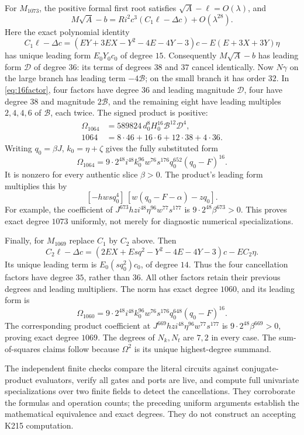 For $M_{1073}$, the positive formal first root satisfies
$\sqrt A-\ell=O(\lambda)$, and
\[
 M\sqrt A-b=Ri^2c^3(C_1\ell-\Delta c)+O(\lambda^{28}).
\]
Here the exact polynomial identity
\[
 C_1\ell-\Delta c
 =(EY+3EX-Y^2-4E-4Y-3)c-E(E+3X+3Y)\eta
\]
has unique leading form $E_0Y_0c_0$ of degree $15$.
Consequently $M\sqrt A-b$ has leading form $\mathcal D$ of degree $36$:
its terms of degrees $38$ and $37$ cancel identically.
Now $N\gamma$ on the large branch has leading term $-4\mathcal B$;
on the small branch it has order $32$.
In \eqref{eq:16factor}, four factors have degree $36$ and leading
magnitude $\mathcal D$, four have degree $38$ and magnitude
$2\mathcal B$, and the remaining eight have leading multiples
$2,4,4,6$ of $\mathcal B$, each twice. The signed product is positive:
\begin{align*}
 \Omega_{1064}
 &=589824\,d_0^8H_0^{16}\mathcal B^{12}\mathcal D^4,\\
 1064&=8\cdot46+16\cdot6+12\cdot38+4\cdot36.
\end{align*}
Writing $q_0=\beta J$, $k_0=\eta+\zeta$ gives the fully substituted form
\begin{equation}
 \Omega_{1064}=9\cdot2^{48}i^{48}k_0^{96}w^{76}s^{176}
                     q_0^{652}(q_0-F)^{16}.\label{eq:top1073}
\end{equation}
It is nonzero for every authentic slice $\beta>0$.
The product's leading form multiplies this by
\[
 [-hw s q_0^4]\,[w(q_0-F-\alpha)-zq_0].
\]
For example, the coefficient of
$J^{673}hz i^{48}\eta^{96}w^{77}s^{177}$ is
$9\cdot2^{48}\beta^{673}>0$. This proves exact degree $1073$ uniformly,
not merely for diagnostic numerical specializations.

Finally, for $M_{1069}$ replace $C_1$ by $C_2$ above. Then
\[
 C_2\ell-\Delta c
 =(2EX+Esq^2-Y^2-4E-4Y-3)c-EC_2\eta.
\]
Its unique leading term is $E_0(sq_0^2)c_0$, of degree $14$.
Thus the four cancellation factors have degree $35$, rather than $36$.
All other factors retain their previous degrees and leading multipliers.
The norm has exact degree $1060$, and its leading form is
\[
 \Omega_{1060}=9\cdot2^{48}i^{48}k_0^{96}w^{76}s^{176}
                     q_0^{648}(q_0-F)^{16}.
\]
The corresponding product coefficient at
$J^{669}hz i^{48}\eta^{96}w^{77}s^{177}$ is
$9\cdot2^{48}\beta^{669}>0$, proving exact degree $1069$.
The degrees of $N_k,N_t$ are $7,2$ in every case. The sum-of-squares
claims follow because $\Omega^2$ is its unique highest-degree summand.

The independent finite checks compare the literal circuits against
conjugate-product evaluators, verify all gates and ports are live, and
compute full univariate specializations over two finite fields to detect
the cancellations. They corroborate the formulas and operation counts;
the preceding uniform arguments establish the mathematical equivalence
and exact degrees. They do not construct an accepting K215 computation.
